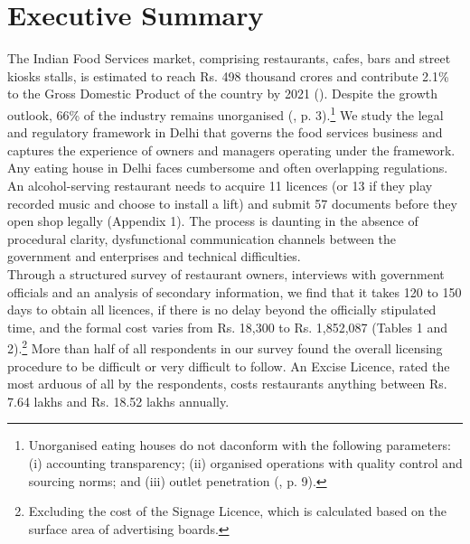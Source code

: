 \documentclass[a4paper, 12pt]{article}
\begin{document}
         
 
                        
                    \newpage
                    \section*{Executive Summary}
                    
                    
                    The Indian Food Services market, comprising restaurants, cafes, bars and street kiosks stalls, is estimated to reach Rs. 498 thousand crores and contribute 2.1\% to the Gross Domestic Product of the country by 2021 (\cite{kpmg2016foodservindustry}). 
Despite the growth outlook, 66\% of the industry remains unorganised (\cite{kpmg2016foodservindustry}, p. 3).\footnote{Unorganised eating houses do not daconform with the following parameters: (i) accounting transparency; (ii) organised operations with quality control and sourcing norms; and 
(iii) outlet penetration (\cite{ficci2017foodservindustry}, p. 9).}  We study the legal and regulatory framework in Delhi that governs the food services business and captures the experience of owners and managers operating under the framework.\\
                   
          Any eating house in Delhi faces cumbersome and often overlapping regulations. An alcohol-serving restaurant needs to acquire 11 licences (or 13 if they play recorded music and choose to install a lift) and submit 57 documents before they open shop legally (Appendix 1). The process is daunting in the absence of procedural clarity, dysfunctional communication channels between the government and enterprises and technical difficulties.  \\
                    
                    Through a structured survey of restaurant owners, interviews with government officials and an analysis of secondary information, we find that it takes 120 to 150 days to obtain all licences, if there is no delay beyond the officially stipulated time, and the 
formal cost varies from Rs. 18,300 to Rs. 1,852,087 (Tables 1 and 2).\footnote{Excluding the cost of the Signage Licence, which is calculated based on the surface area of advertising boards.} More than half of all respondents in our survey found the overall 
licensing procedure to be difficult or very difficult to follow. An Excise Licence, rated the most arduous of all by the respondents, costs restaurants anything between Rs. 7.64 lakhs and Rs. 18.52 lakhs annually. \\
                    
\end{document}
